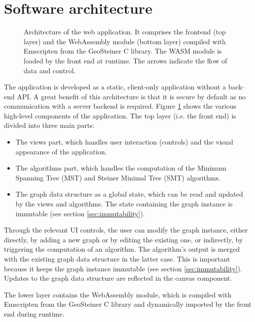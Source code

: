 \documentclass{l4proj}
\begin{document}
\section{Software architecture}
\label{sec:software_architecture}
\begin{figure}[htbp]
    \centering
    
    \caption{Architecture of the web application. It comprises the frontend (top layer) and the WebAssembly module (bottom layer) compiled with Emscripten from the GeoSteiner C library. The WASM module is loaded by the front end at runtime. The arrows indicate the flow of data and control.}
    \label{fig:architecture}
\end{figure}
The application is developed as a static, client-only application without a back-end API. A great benefit of this architecture is that it is secure by default as no communication with a server backend is required.
Figure \ref{fig:architecture} shows the various high-level components of the application. The top layer (i.e. the front end) is divided into three main parts:
\begin{itemize}
    \item The views part, which handles user interaction (controls) and the visual appearance of the application.
    \item The algorithms part, which handles the computation of the Minimum Spanning Tree (MST) and Steiner Minimal Tree (SMT) algorithms.
    \item The graph data structure as a global state, which can be read and updated by the views and algorithms. The state containing the graph instance is immutable (see section \ref{sec:immutability}).
\end{itemize}



Through the relevant UI controls, the user can modify the graph instance, either directly, by adding a new graph or by editing the existing one, or indirectly, by triggering the computation of an algorithm. The algorithm's output is merged with the existing graph data structure in the latter case. This is important because it keeps the graph instance immutable (see section \ref{sec:immutability}).
Updates to the graph data structure are reflected in the canvas component.

The lower layer contains the WebAssembly module, which is compiled with Emscripten from the GeoSteiner C library and dynamically imported by the front end during runtime.
\end{document}
